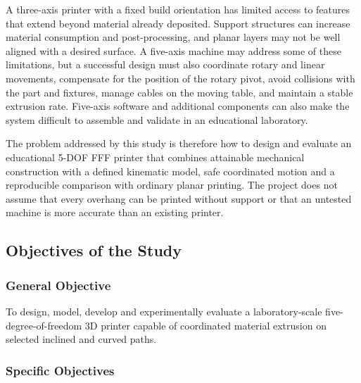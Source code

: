 \documentclass[12pt,a4paper]{article}
\begin{document}
A three-axis printer with a fixed build orientation has limited access to features that extend beyond
  material already deposited. Support structures can increase material consumption and post-processing,
  and planar layers may not be well aligned with a desired surface. A five-axis machine may address some
  of these limitations, but a successful design must also coordinate rotary and linear movements,
  compensate for the position of the rotary pivot, avoid collisions with the part and fixtures, manage
  cables on the moving table, and maintain a stable extrusion rate. Five-axis software and additional
  components can also make the system difficult to assemble and validate in an educational laboratory.

The problem addressed by this study is therefore how to design and evaluate an educational 5-DOF FFF
  printer that combines attainable mechanical construction with a defined kinematic model, safe
  coordinated motion and a reproducible comparison with ordinary planar printing. The project does not
  assume that every overhang can be printed without support or that an untested machine is more accurate
  than an existing printer.

\subsection{Objectives of the Study}\label{objectives-of-the-study}

\subsubsection{General Objective}\label{general-objective}

To design, model, develop and experimentally evaluate a laboratory-scale five-degree-of-freedom 3D
  printer capable of coordinated material extrusion on selected inclined and curved paths.

\subsubsection{Specific Objectives}\label{specific-objectives}
\end{document}
